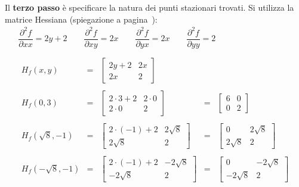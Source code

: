 \documentclass[a4paper]{article}
\begin{document}
	\noindent
	Il \textbf{terzo passo} è specificare la natura dei punti stazionari trovati. Si utilizza la matrice Hessiana (spiegazione a pagina~\pageref{par: determinare valore di un parametro così da trovare un punto critico}):
	\begin{gather*}
		\dfrac{\partial^{2} f}{\partial xx} = 2y+2 \hspace{2em}
		\dfrac{\partial^{2} f}{\partial xy} = 2x \hspace{2em}
		\dfrac{\partial^{2} f}{\partial yx} = 2x \hspace{2em}
		\dfrac{\partial^{2} f}{\partial yy} = 2 \\
		\\
		\begin{array}{rclcl}
			H_{f}\left(x,y\right) &=& \begin{bmatrix}
				2y+2 	& 2x \\
				2x		& 2
			\end{bmatrix} &&\\
			\\
			H_{f}\left(0,3\right) &=& \begin{bmatrix}
				2 \cdot 3+2 	& 2 \cdot 0 \\
				2 \cdot 0		& 2
			\end{bmatrix} &=& \begin{bmatrix}
				6 & 0 \\
				0 & 2 
			\end{bmatrix} \\
			\\
			H_{f}\left(\sqrt{8},-1\right) &=& \begin{bmatrix}
				2 \cdot \left(-1\right) +2 	& 2\sqrt{8} \\
				2\sqrt{8}		& 2
			\end{bmatrix} &=& \begin{bmatrix}
				0 & 2\sqrt{8} \\
				2\sqrt{8} & 2
			\end{bmatrix} \\
			\\
			H_{f}\left(-\sqrt{8},-1\right) &=& \begin{bmatrix}
				2 \cdot \left(-1\right)+2 	& -2\sqrt{8} \\
				-2\sqrt{8}		& 2
			\end{bmatrix} &=& \begin{bmatrix}
				0 & -2\sqrt{8} \\
				-2\sqrt{8} & 2
			\end{bmatrix}
		\end{array}
	\end{gather*}\newpage
\end{document}
